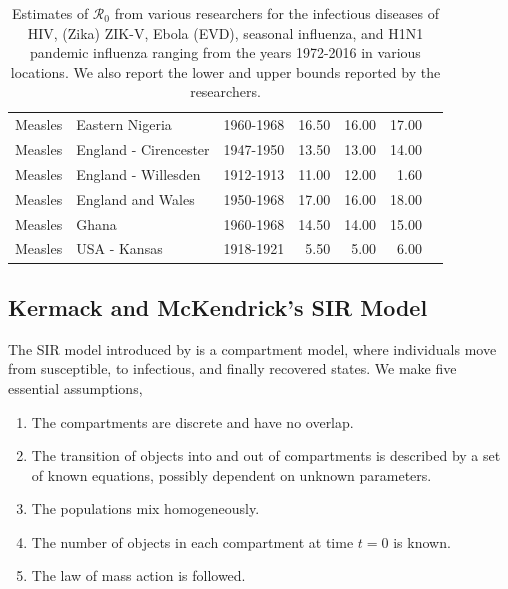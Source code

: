 \documentclass[12pt]{article}
\newcommand{\rr}{\ensuremath{\mathcal{R}_0}}
\begin{document}
\begin{landscape}
\begin{table}
\begin{tabular}{@{}lllrrrl@{}}
    Measles     & Eastern Nigeria                  & 1960-1968                          & 16.50        & 16.00          & 17.00           & \cite{anderson1992}     \\
  Measles      & England - Cirencester                 & 1947-1950                          & 13.50   & 13.00           & 14.00            & \cite{fraser2009}     \\
  Measles     & England - Willesden                  & 1912-1913                          & 11.00        & 12.00       & 1.60            & \cite{anderson1992}     \\  
  Measles     & England and Wales                  & 1950-1968                          & 17.00      & 16.00          & 18.00         & \cite{anderson1992}     \\
    Measles     & Ghana                 & 1960-1968                          & 14.50       & 14.00          & 15.00            & \cite{anderson1992}     \\
  Measles     & USA - Kansas                  & 1918-1921                          & 5.50    & 5.00          & 6.00          & \cite{anderson1992}     \\
\bottomrule
\end{tabular}
\caption{Estimates of $\rr$ from various researchers for the infectious diseases of HIV, (Zika) ZIK-V, Ebola (EVD), seasonal influenza, and H1N1 pandemic influenza ranging from the years 1972-2016 in various locations.  We also report the lower and upper bounds reported by the researchers.}
\label{tab:r0-real-ex}
\end{table}
\end{landscape}



\subsection{Kermack and McKendrick's SIR Model}
\label{sec:sir-intro}

The SIR model introduced by \cite{Kermack700} is a compartment model, where individuals move from susceptible, to infectious, and finally recovered states.  We make five essential assumptions,
\begin{enumerate}
\item The compartments are discrete and have no overlap.
\item The transition of objects into and out of compartments is described by a set of known equations, possibly dependent on unknown parameters.
\item The populations mix homogeneously.
\item The number of objects in each compartment at time $t=0$ is known.
  \item The law of mass action is followed.
  \end{enumerate}  
\end{document}
